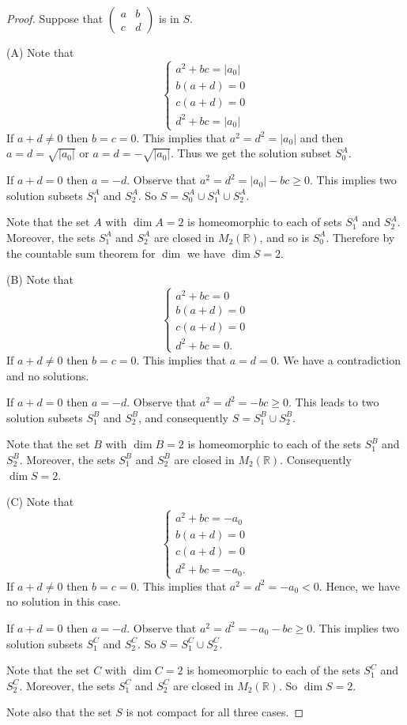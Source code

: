 \documentclass[10pt,a4paper]{amsart}
\begin{document}
\begin{proof}
Suppose that $ \left(\begin{array}{rr}  a & b \\ c & d  \end{array}\right)$ is in $S.$

(A) Note that
$$
\left\{\begin{array}{l} a^2+bc= |a_0| \\ b(a+d) = 0\\c(a+d) = 0 \\  d^2+bc= |a_0|\end{array}\right.
$$
If $a+d \ne 0$ then $b=c=0$. This implies that $a^2 = d^2 = |a_0|$ and then $a= d = \sqrt{|a_0|}$ or 
$a= d = -\sqrt{|a_0|}$. Thus we get the solution subset $S^A_0$. 

\noindent 
If $a+d = 0$ then $a= -d$. Observe that $a^2 = d^2 = |a_0| -bc \geq 0$. This implies
two  solution subsets $S^A_1$ and $S^A_2$.  So $S = S^A_0 \cup S^A_1 \cup S^A_2$.

Note that the set $A$ with $\dim A = 2$ is homeomorphic to each of sets $S^A_1$ and $S^A_2$. Moreover, the sets 
$S^A_1$ and $S^A_2$ are closed in $M_2(\mathbb R)$, and so is $S^A_0$. Therefore by the countable sum theorem for $\dim$ we have  $\dim S = 2.$

(B) Note that 
$$
\left\{\begin{array}{l} a^2+bc= 0 \\ b(a+d) = 0\\c(a+d) = 0 \\  d^2+bc= 0.  \end{array}\right.
$$
If $a+d \ne 0$ then $b=c=0$. This implies that $a =d =0$. We have a contradiction and no solutions.

\noindent 
If $a+d = 0$ then $a= -d$. Observe that $a^2 = d^2 =  -bc \geq 0$. This leads to
two  solution subsets $S^B_1$ and $S^B_2$, and consequently $S = S^B_1 \cup S^B_2$.

Note that the set $B$ with $\dim B = 2$ is homeomorphic to each of the sets $S^B_1$ and $S^B_2$. Moreover, the sets 
$S^B_1$ and $S^B_2$ are closed in $M_2(\mathbb R)$. Consequently $\dim S = 2.$

(C) Note that
$$
\left\{\begin{array}{l} a^2+bc= -a_0 \\ b(a+d) = 0\\c(a+d) = 0 \\  d^2+bc= -a_0.  \end{array}\right.
$$
If $a+d \ne 0$ then $b=c=0$. This implies that $a^2 = d^2 = -a_0 < 0$. Hence, we have no solution in this case.

\noindent 
If $a+d = 0$ then $a= -d$. Observe that $a^2 = d^2 = -a_0 -bc \geq 0$. This implies
two  solution subsets $S^C_1$ and $S^C_2$.  So $S = S^C_1 \cup S^C_2$.

Note that the set $C$ with $\dim C = 2$ is homeomorphic to each of the sets $S^C_1$ and $S^C_2$. Moreover, the sets 
$S^C_1$ and $S^C_2$ are closed in $M_2(\mathbb R)$. So  $\dim S = 2.$

Note also that the set $S$ is not compact for all three cases. 
\end{proof}
\end{document}
